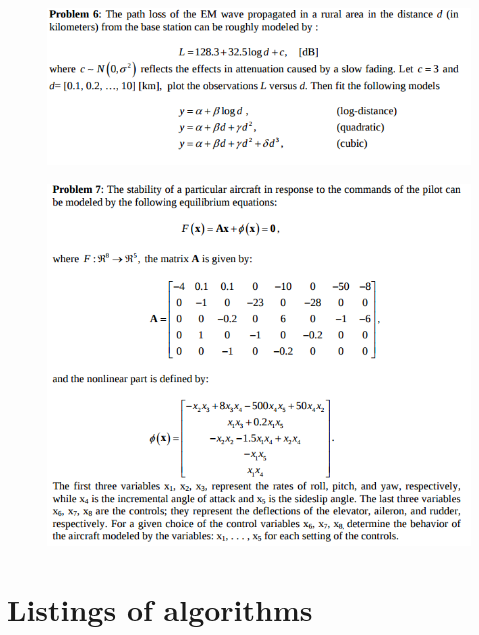 \documentclass[eng,openany]{mgr}
\begin{document}
\clearpage
\begin{figure}[h]
\centering
\includegraphics[width=0.7\linewidth]{screenshot010}
\label{fig:screenshot010}
\end{figure}

\clearpage
\begin{figure}[h]
	\centering
	\includegraphics[width=0.7\linewidth]{screenshot011}
	\label{fig:screenshot010}
\end{figure}









\clearpage
\chapter{Listings of algorithms}
\end{document}
